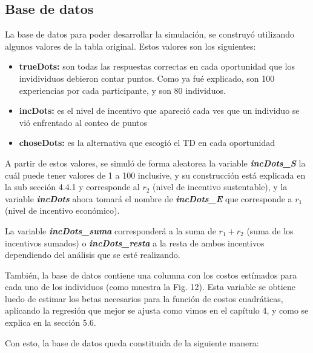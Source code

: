 \documentclass[11pt,letterpaper]{article}
\begin{document}
\subsection{Base de datos}

La base de datos para poder desarrollar la simulación, se construyó utilizando algunos valores de la tabla original. Estos valores son los siguientes:

\begin{itemize}
    \item \textbf{trueDots:} son todas las respuestas correctas en cada oportunidad que los invidividuos debieron contar puntos. Como ya fué explicado, son 100 experiencias por cada participante, y son 80 individuos.
    \item \textbf{incDots:} es el nivel de incentivo que apareció cada ves que un individuo se vió enfrentado al conteo de puntos
    \item \textbf{choseDots:} es la alternativa que escogió el TD en cada oportunidad
\end{itemize}

A partir de estos valores, se simuló de forma aleatorea la variable \textbf{\textit{incDots\_S}} la cuál puede tener valores de 1 a 100 inclusive, y su construcción está explicada en la sub sección 4.4.1 y corresponde al $r_2$ (nivel de incentivo sustentable), y la variable \textbf{\textit{incDots}} ahora tomará el nombre de \textbf{\textit{incDots\_E}} que corresponde a $r_1$ (nivel de incentivo económico).

La variable \textbf{\textit{incDots\_suma}} corresponderá a la suma de $r_1 + r_2$ (suma de los incentivos sumados) o \textbf{\textit{incDots\_resta}} a la resta de ambos incentivos dependiendo del análisis que se esté realizando.

También, la base de datos contiene una columna con los costos estímados para cada uno de los individuos (como muestra la Fig. 12). Esta variable se obtiene luedo de estimar los betas necesarios para la función de costos cuadráticas, aplicando la regresión que mejor se ajusta como vimos en el capítulo 4, y como se explica en la sección 5.6. 



Con esto, la base de datos queda constituida de la siguiente manera:
\end{document}
